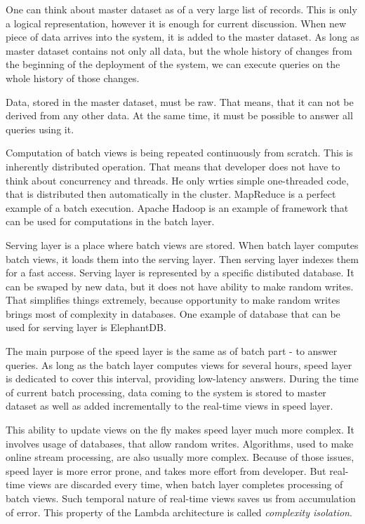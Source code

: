 One can think about master dataset as of a very large list of records.
This is only a logical representation, however it is enough for current
discussion.
When new piece of data arrives into the system, it is added to the master
dataset.
As long as master dataset contains not only all data, but the whole history of
changes from the beginning of the deployment of the system, we can execute
queries on the whole history of those changes.

Data, stored in the master dataset, must be raw.
That means, that it can not be derived from any other data.
At the same time, it must be possible to answer all queries using it. 

Computation of batch views is being repeated continuously from scratch.
This is inherently distributed operation.
That means that developer does not have to think about concurrency and threads.
He only wrties simple one-threaded code, that is distributed then
automatically in the cluster.
MapReduce is a perfect example of a batch execution.
Apache Hadoop is an example of framework that can be used for computations in
the batch layer.


Serving layer is a place where batch views are stored.
When batch layer computes batch views, it loads them into the serving layer.
Then serving layer indexes them for a fast access.
Serving layer is represented by a specific distibuted database. 
It can be swaped by new data, but it does not have ability to make random
writes.
That simplifies things extremely, because opportunity to make random writes
brings most of complexity in databases.
One example of database that can be used for serving layer is ElephantDB.


The main purpose of the speed layer is the same as of batch part - to answer
queries.
As long as the batch layer computes views for several hours, speed layer is
dedicated to cover this interval, providing low-latency answers.
During the time of current batch processing, data coming to the system is stored
to master dataset as well as added incrementally to the real-time views in
speed layer.

This ability to update views on the fly makes speed layer much more complex.
It involves usage of databases, that allow random writes.
Algorithms, used to make online stream processing, are also usually more
complex.
Because of those issues, speed layer is more error prone, and takes more effort
from developer.
But real-time views are discarded every time, when batch layer completes
processing of batch views.
Such temporal nature of real-time views saves us from accumulation of
error.
This property of the Lambda architecture is called \textit{complexity isolation}.

